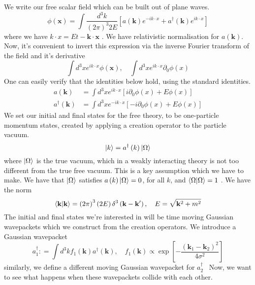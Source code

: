 \documentclass[11pt, oneside]{article}   	%
\theoremstyle{slanted}
\let\vec\mathbf
\begin{document}
We write our free scalar field 
which can be built out of plane waves. 
\[
\phi \left( \vec{x}  \right)  = \int \frac{d^ 3 k }{ \left( 2 \pi  \right)  ^ 3 
2 E } \left[  a \left( \vec{k}  \right)  e^{  - i k \cdot  x } + 
a ^\dagger \left( \vec{k}  \right)  e ^{ i k \cdot  x } \right] 
\] where we have $ k \cdot  x  = E t  - \vec{k} \cdot  \vec{x} $ . 
We have relativistic 
normalisation for $ a \left( \vec{k}  \right)  $. 
Now, it's convenient to 
invert this expression via the inverse Fourier transform 
of the field and it's derivative 
\[
\int d ^ 3 x e ^{ i k \cdot  x } \phi \left( \vec{x}  \right)  , \quad 
\int d ^ 3 x e ^{ i k \cdot   x } \partial  _ 0 \phi \left( x    \right)  
\] One 
can easily verify that the identities below 
hold, using the standard identities. 
\begin{align*}
a\left( \vec{k}   \right)  &=  \int d ^ 3 x e ^{ i k \cdot  x } 
\left[  i \partial  _ 0 \phi \left( x \right) + E \phi \left( x  \right)    \right]  \\ 
a ^\dagger \left( \vec{k}  \right)  &=  \int d ^ 3 x e ^{  - i k \cdot   x } 
\left[   -  i \partial  _ 0 \phi (x ) + E \phi \left( x  \right)   \right] 
\end{align*}
We set our initial and final states for the free theory,
to be one-particle momentum states, 
created by applying a creation operator 
to the particle vacuum. 
\[
\ket{ k }  = a ^\dagger \left( k  \right)  \ket{ \Omega } 
\] where $ \ket{ \Omega } $ is the true vacuum, 
which in a weakly interacting theory is 
not too different from the true free vacuum.
This is a key assumption which 
we have to make. 
We have that $ \ket{ \Omega }  $ satisfies 
$ a \left( k  \right)   \ket{ \Omega }  = 0 $, 
for all  $ k $, and $ \bra{ \Omega }\ket{ \Omega }  = 1 $ . 
We have the norm 
\[
\bra{ \vec{k} }\ket{\vec{k}} = \left( 2 \pi  \right)  ^ 3 \left( 2 E  \right)  
\delta ^ 3 \left( \vec{k} - \vec{k}  '  \right)  , \quad E  = \sqrt{ \vec{k}^ 2 + m ^ 2 } 
\] 
The initial and
final states we're interested in will 
be time moving Gaussian wavepackets which we 
construct from the creation operators. We introduce a Gaussian wavepacket 
\[
a _ 1 ^\dagger : = \int d ^ 3 k f _ 1 \left( \vec{k}  \right)  a ^\dagger \left( \vec{k}  \right)  
, \quad f _ 1 \left( \vec{k}  \right)  \propto \exp \left[  
- \frac{\left( \vec{k}_ 1  - \vec{k} _ 2   \right)  ^ 2   }{ 4 \sigma ^ 2 }\right] 
\] similarly, we define a different moving Gaussian wavepacket for $ a _ 2 ^\dagger $ 
Now, we want to see what happens 
when these wavepackets collide with each other. 
\end{document}
